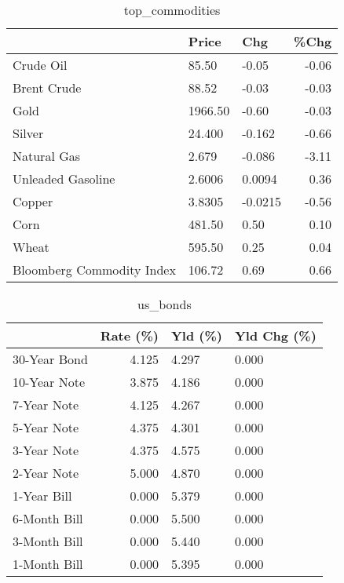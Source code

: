 \documentclass{article}%
\begin{document}
\begin{table}[htbp]%
\caption{top\_commodities}%
\centering%
\begin{adjustbox}{width=1\textwidth}%
\begin{tabular}{lllr}
\toprule
                          &   Price &     Chg &  \%Chg \\
\midrule
               Crude Oil  &   85.50 &   -0.05 & -0.06 \\
             Brent Crude  &   88.52 &   -0.03 & -0.03 \\
                    Gold  & 1966.50 &   -0.60 & -0.03 \\
                  Silver  &  24.400 &  -0.162 & -0.66 \\
             Natural Gas  &   2.679 &  -0.086 & -3.11 \\
       Unleaded Gasoline  &  2.6006 &  0.0094 &  0.36 \\
                  Copper  &  3.8305 & -0.0215 & -0.56 \\
                    Corn  &  481.50 &    0.50 &  0.10 \\
                   Wheat  &  595.50 &    0.25 &  0.04 \\
Bloomberg Commodity Index &  106.72 &    0.69 &  0.66 \\
\bottomrule
\end{tabular}
%
\end{adjustbox}%
\end{table}

%


\begin{table}[htbp]%
\caption{us\_bonds}%
\centering%
\begin{adjustbox}{width=1\textwidth}%
\begin{tabular}{lrll}
\toprule
             &  Rate (\%) & Yld (\%) & Yld Chg (\%) \\
\midrule
30-Year Bond &     4.125 &   4.297 &       0.000 \\
10-Year Note &     3.875 &   4.186 &       0.000 \\
 7-Year Note &     4.125 &   4.267 &       0.000 \\
 5-Year Note &     4.375 &   4.301 &       0.000 \\
 3-Year Note &     4.375 &   4.575 &       0.000 \\
 2-Year Note &     5.000 &   4.870 &       0.000 \\
 1-Year Bill &     0.000 &   5.379 &       0.000 \\
6-Month Bill &     0.000 &   5.500 &       0.000 \\
3-Month Bill &     0.000 &   5.440 &       0.000 \\
1-Month Bill &     0.000 &   5.395 &       0.000 \\
\bottomrule
\end{tabular}
%
\end{adjustbox}%
\end{table}
\end{document}
